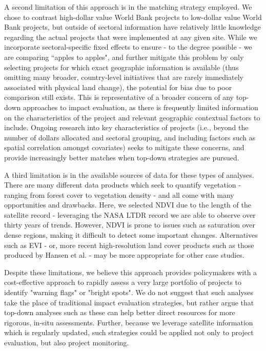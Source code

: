 \documentclass[sustainability,article,submit,moreauthors,pdftex,10pt,a4paper]{mdpi}
\begin{document}
A second limitation of this approach is in the matching strategy employed. We chose to contrast high-dollar value World Bank projects to low-dollar value World Bank projects, but outside of sectoral information have relatively little knowledge regarding the actual projects that were implemented at any given site. While we incorporate sectoral-specific fixed effects to ensure - to the degree possible - we are comparing  ``apples to apples", and further mitigate this problem by only selecting projects for which exact geographic information is available (thus omitting many broader, country-level initiatives that are rarely immediately associated with physical land change), the potential for bias due to poor comparison still exists. This is representative of a broader concern of any top-down approaches to impact evaluation, as there is frequently limited information on the characteristics of the project and relevant geographic contextual factors to include. Ongoing research into key characteristics of projects (i.e., beyond the number of dollars allocated and sectoral grouping, and including factors such as spatial correlation amongst covariates) seeks to mitigate these concerns, and provide increasingly better matches when top-down strategies are pursued.
\par
A third limitation is in the available sources of data for these types of analyses.  There are many different data products which seek to quantify vegetation - ranging from forest cover to vegetation density - and all come with many opportunities and drawbacks.  
Here, we selected NDVI due to the length of the satellite record - leveraging the NASA LTDR record we are able to observe over thirty years of trends.  
However, NDVI is prone to issues such as saturation over dense regions, making it difficult to detect some important changes.  
Alternatives such as EVI - or, more recent high-resolution land cover products such as those produced by Hansen et al. \cite{hansen2013high} - may be more appropriate for other case studies.
\par
Despite these limitations, we believe this approach provides policymakers with a cost-effective approach to rapidly assess a very large portfolio of projects to identify "warning flags" or "bright spots". We do not suggest that such analyses take the place of traditional impact evaluation strategies, but rather argue that top-down analyses such as these can help better direct resources for more rigorous, in-situ assessments. Further, because we leverage satellite information which is regularly updated, such strategies could be applied not only to project evaluation, but also project monitoring.
\end{document}
